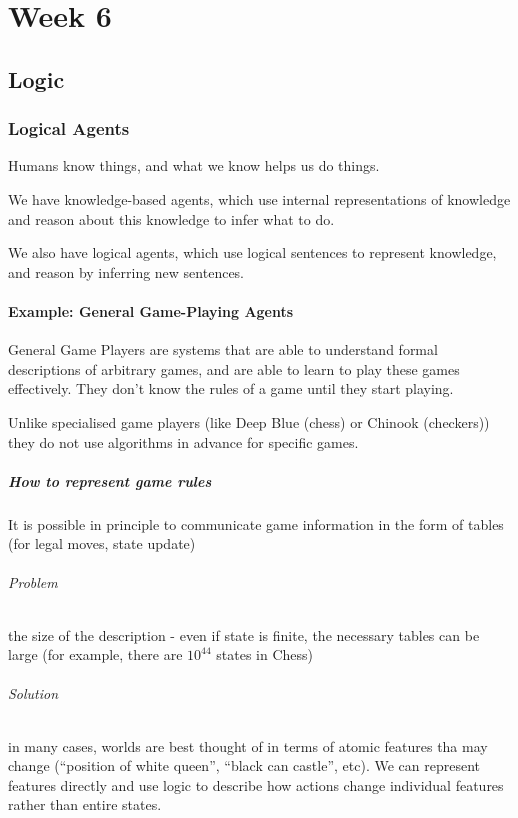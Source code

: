\part{Week 6}
\chapter{Logic}
\section{Logical Agents}
Humans know things, and what we know helps us do things.

We have knowledge-based agents, which use internal representations of knowledge
and reason about this knowledge to infer what to do.

We also have logical agents, which use logical sentences to represent
knowledge, and reason by inferring new sentences.

\subsection{Example: General Game-Playing Agents}
General Game Players are systems that are able to understand formal
descriptions of arbitrary games, and are able to learn to play these games
effectively. They don't know the rules of a game until they start playing.

Unlike specialised game players (like Deep Blue (chess) or Chinook (checkers))
they do not use algorithms in advance for specific games.

\subsubsection{How to represent game rules}
It is possible in principle to communicate game information in the form of
tables (for legal moves, state update)

\paragraph{Problem} the size of the description - even if state is finite, the
necessary tables can be large (for example, there are $10^{44}$ states in
Chess)

\paragraph{Solution} in many cases, worlds are best thought of in terms of
atomic features tha may change (``position of white queen'', ``black can
castle'', etc). We can represent features directly and use logic to describe
how actions change individual features rather than entire states.

